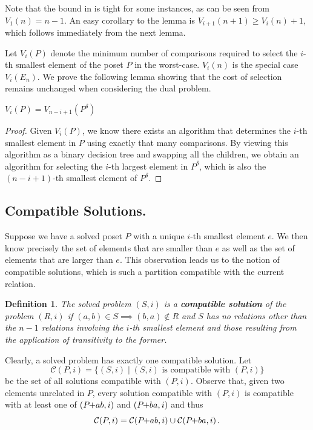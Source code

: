\documentclass[twoside,leqno,twocolumn]{article}
\newcommand{\pchild}[3]{{#1}\kern-1pt{+}{#2}{#3}}
\newcommand{\dual}[1]{{#1}^{\delta}}
\newtheorem{definition}{Definition}[section]
\begin{document}
Note that the bound in  is tight for some instances, as can be seen from $V_1(n) = n - 1$.
An easy corollary to the lemma is $V_{i + 1}(n + 1) \geq V_i(n) + 1$, which follows immediately from the next lemma.

Let $V_i(P)$ denote the minimum number of comparisons required to select the $i$-th smallest element of the poset $P$ in the worst-case.
$V_i(n)$ is the special case $V_i(E_n)$.
We prove the following lemma showing that the cost of selection remains unchanged when considering the dual problem.

\begin{lemma} \label{lemma:dual_poset_allowed}
  $V_i(P) = V_{n - i + 1}(\dual{P})$
\end{lemma}

\begin{proof}
  Given $V_i(P)$, we know there exists an algorithm that determines the $i$-th smallest element in $P$ using exactly that many comparisons.
  By viewing this algorithm as a binary decision tree and swapping all the children, we obtain an algorithm for selecting the $i$-th largest element in $\dual{P}$, which is also the $(n - i + 1)$-th smallest element of $\dual{P}$.
\end{proof}

\subsection{Compatible Solutions.}
Suppose we have a solved poset $P$ with a unique $i$-th smallest element $e$.
We then know precisely the set of elements that are smaller than $e$ as well as the set of elements that are larger than $e$.
This observation leads us to the notion of compatible solutions, which is such a partition compatible with the current relation.

\begin{definition}
  The solved problem $(S, i)$ is a \textbf{compatible solution} of the problem $(R, i)$ if $(a, b) \in S \implies (b, a) \notin R$ and $S$ has no relations other than the $n - 1$ relations involving the $i$-th smallest element and those resulting from the application of transitivity to the former.
\end{definition}

Clearly, a solved problem has exactly one compatible solution.
Let
\begin{equation*}
  \mathcal{C}(P, i) = \{(S, i) \mid (S, i) \text{ is compatible with } (P, i)\}
\end{equation*}
be the set of all solutions compatible with $(P, i)$.
Observe that, given two elements unrelated in $P$, every solution compatible with $(P, i)$ is compatible with at least one of $(\pchild{P}{a}{b}, i)$ and $(\pchild{P}{b}{a}, i)$ and thus
\begin{equation}\label{lemma:compatible_union}
  \mathcal{C}(P, i) = \mathcal{C}(\pchild{P}{a}{b}, i) \cup \mathcal{C}(\pchild{P}{b}{a}, i)\,\text{.}
\end{equation}
\end{document}
